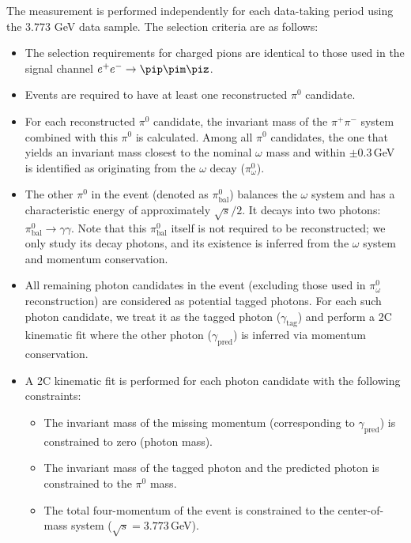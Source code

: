 The measurement is performed independently for each data-taking period using the $3.773$ GeV data sample. The selection criteria are as follows:
\begin{itemize}
    \item The selection requirements for charged pions are identical to those used in the signal channel $e^+e^- \to \pip\pim\piz$.

    \item Events are required to have at least one reconstructed $\pi^0$ candidate.

    \item For each reconstructed $\pi^0$ candidate, the invariant mass of the $\pi^+\pi^-$ system combined with this $\pi^0$ is calculated. Among all $\pi^0$ candidates, the one that yields an invariant mass closest to the nominal $\omega$ mass and within $\pm0.3$\,GeV is identified as originating from the $\omega$ decay ($\pi^0_{\omega}$).

    \item The other $\pi^0$ in the event (denoted as $\pi^0_{\text{bal}}$) balances the $\omega$ system and has a characteristic energy of approximately $\sqrt{s}/2$. It decays into two photons: $\pi^0_{\text{bal}} \to \gamma\gamma$. Note that this $\pi^0_{\text{bal}}$ itself is not required to be reconstructed; we only study its decay photons, and its existence is inferred from the $\omega$ system and momentum conservation.

    \item All remaining photon candidates in the event (excluding those used in $\pi^0_{\omega}$ reconstruction) are considered as potential tagged photons. For each such photon candidate, we treat it as the tagged photon ($\gamma_{\text{tag}}$) and perform a 2C kinematic fit where the other photon ($\gamma_{\text{pred}}$) is inferred via momentum conservation.

    \item A 2C kinematic fit is performed for each photon candidate with the following constraints:
          \begin{itemize}
              \item The invariant mass of the missing momentum (corresponding to $\gamma_{\text{pred}}$) is constrained to zero (photon mass).
              \item The invariant mass of the tagged photon and the predicted photon is constrained to the $\pi^0$ mass.
              \item The total four-momentum of the event is constrained to the center-of-mass system ($\sqrt{s} = 3.773$\,GeV).
          \end{itemize}


\end{itemize}
